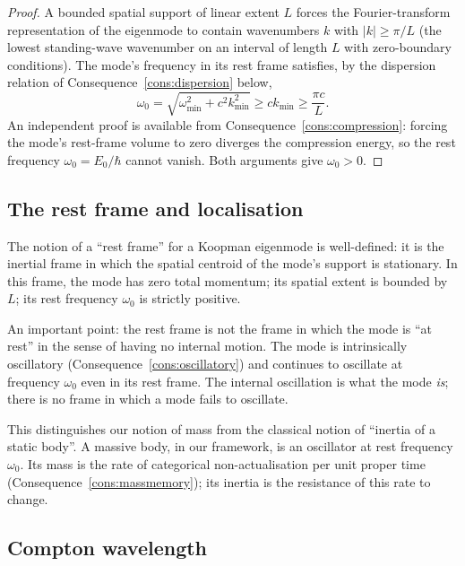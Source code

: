 \documentclass[11pt,twocolumn,a4paper]{article}
\theoremstyle{axiomstyle}
\theoremstyle{conseqstyle}
\theoremstyle{definition}
\theoremstyle{remark}
\begin{document}
\begin{proof}
A bounded spatial support of linear extent $L$ forces the Fourier-transform representation of the eigenmode to contain wavenumbers $k$ with $|k|\ge\pi/L$ (the lowest standing-wave wavenumber on an interval of length $L$ with zero-boundary conditions). The mode's frequency in its rest frame satisfies, by the dispersion relation of Consequence~\ref{cons:dispersion} below,
\begin{equation*}
\omega_{0}=\sqrt{\omega_{\min}^{2}+c^{2}k_{\min}^{2}}\ge ck_{\min}\ge\frac{\pi c}{L}.
\end{equation*}
An independent proof is available from Consequence~\ref{cons:compression}: forcing the mode's rest-frame volume to zero diverges the compression energy, so the rest frequency $\omega_{0}=E_{0}/\hbar$ cannot vanish. Both arguments give $\omega_{0}>0$.
\end{proof}

\subsection{The rest frame and localisation}

The notion of a ``rest frame'' for a Koopman eigenmode is well-defined: it is the inertial frame in which the spatial centroid of the mode's support is stationary. In this frame, the mode has zero total momentum; its spatial extent is bounded by $L$; its rest frequency $\omega_{0}$ is strictly positive.

An important point: the rest frame is not the frame in which the mode is ``at rest'' in the sense of having no internal motion. The mode is intrinsically oscillatory (Consequence~\ref{cons:oscillatory}) and continues to oscillate at frequency $\omega_{0}$ even in its rest frame. The internal oscillation is what the mode \emph{is}; there is no frame in which a mode fails to oscillate.

This distinguishes our notion of mass from the classical notion of ``inertia of a static body''. A massive body, in our framework, is an oscillator at rest frequency $\omega_{0}$. Its mass is the rate of categorical non-actualisation per unit proper time (Consequence~\ref{cons:massmemory}); its inertia is the resistance of this rate to change.

\subsection{Compton wavelength}
\end{document}
